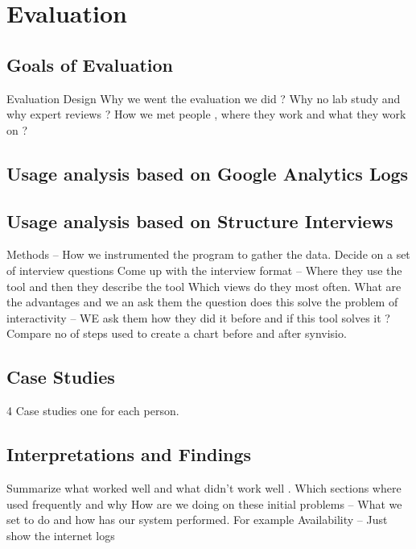 \chapter{Evaluation}

\section{Goals of Evaluation} 
Evaluation Design
Why we went the evaluation we did ?
Why no lab study and why expert reviews ?
How we met people , where they work and what they work on ?

\section{Usage analysis based on Google Analytics Logs}

\section{Usage analysis based on Structure Interviews}
 
Methods – How we instrumented the program to gather the data.
Decide on a set of interview questions 
Come up with the interview format – Where they use the tool and then they describe the tool
Which views do they most often.
What are the advantages and we an ask them the question does this solve the problem of interactivity – WE ask them how they did it before and if this tool solves it ?
Compare no of steps used to create a chart before and after synvisio.

\section{Case Studies}
4 Case studies one for each person.

\section{Interpretations and Findings}  
Summarize what worked well and what didn’t work well .
Which sections where used frequently and why 
How are we doing on these initial problems – What we set to do and how has our system performed.
For example Availability – Just show the internet logs

